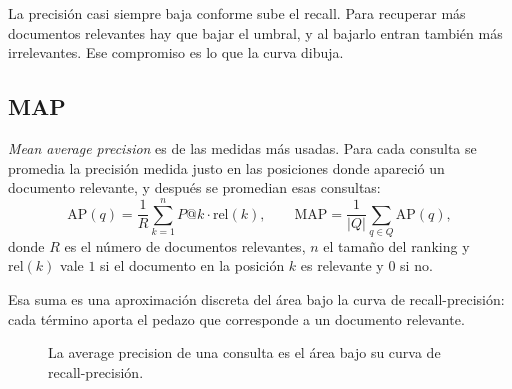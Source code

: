 \documentclass[11pt,letterpaper]{article}
\begin{document}
\begin{ojo}
    La precisión casi siempre baja conforme sube el recall. Para
    recuperar más documentos relevantes hay que bajar el umbral, y al
    bajarlo entran también más irrelevantes. Ese compromiso es lo que
    la curva dibuja.
\end{ojo}


\subsection*{MAP}

\emph{Mean average precision} es de las medidas más usadas. Para cada
consulta se promedia la precisión medida justo en las posiciones donde
apareció un documento relevante, y después se promedian esas
consultas:
\[
    \mathrm{AP}(q) = \frac{1}{R} \sum_{k=1}^{n} P@k \cdot
    \mathrm{rel}(k) ,
    \qquad
    \mathrm{MAP} = \frac{1}{|Q|} \sum_{q \in Q} \mathrm{AP}(q) ,
\]
donde $R$ es el número de documentos relevantes, $n$ el tamaño del
ranking y $\mathrm{rel}(k)$ vale $1$ si el documento en la posición
$k$ es relevante y $0$ si no.

Esa suma es una aproximación discreta del área bajo la curva de
recall-precisión: cada término aporta el pedazo que corresponde a un
documento relevante.

\begin{figure}[htbp]
  \centering
  \caption{La average precision de una consulta es el área bajo su
    curva de recall-precisión.}
  \label{fig:area-map}
\end{figure}
\end{document}
